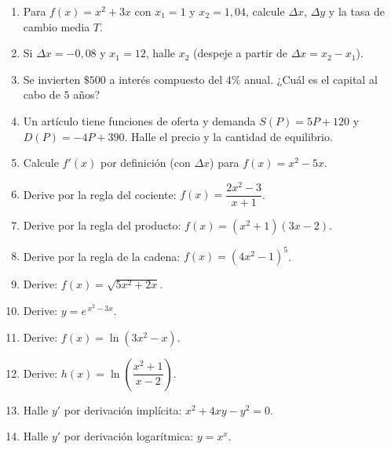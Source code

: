 \documentclass[12pt, letterpaper]{article}
\begin{document}
\begin{enumerate}[leftmargin=*]

  \item \medio{} Para $f(x) = x^{2} + 3x$ con $x_1 = 1$ y $x_2 = 1{,}04$, calcule $\Delta x$, $\Delta y$ y la tasa de cambio media $T$.

  \item \medio{} Si $\Delta x = -0{,}08$ y $x_1 = 12$, halle $x_2$ (despeje a partir de $\Delta x = x_2 - x_1$).

  \item \medio{} Se invierten $\$500$ a interés compuesto del $4\%$ anual. ¿Cuál es el capital al cabo de $5$ años?

  \item \medio{} Un artículo tiene funciones de oferta y demanda $S(P) = 5P + 120$ y $D(P) = -4P + 390$. Halle el precio y la cantidad de equilibrio.

  \item \medio{} Calcule $f'(x)$ por definición (con $\Delta x$) para $f(x) = x^{2} - 5x$.

  \item \medio{} Derive por la regla del cociente: $f(x) = \dfrac{2x^{2} - 3}{x + 1}$.

  \item \dificil{} Derive por la regla del producto: $f(x) = (x^{2}+1)(3x-2)$.

  \item \dificil{} Derive por la regla de la cadena: $f(x) = (4x^{2}-1)^{5}$.

  \item \dificil{} Derive: $f(x) = \sqrt{5x^{2} + 2x}$.

  \item \dificil{} Derive: $y = e^{\,x^{2} - 3x}$.

  \item \dificil{} Derive: $f(x) = \ln(3x^{2} - x)$.

  \item \dificil{} Derive: $h(x) = \ln\!\left(\dfrac{x^{2}+1}{x-2}\right)$.

  \item \dificil{} Halle $y'$ por derivación implícita: $x^{2} + 4xy - y^{2} = 0$.

  \item \muyDificil{} Halle $y'$ por derivación logarítmica: $y = x^{x}$.


\end{enumerate}
\end{document}
